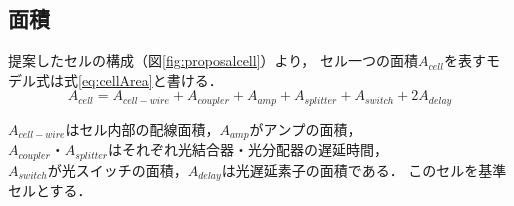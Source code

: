 \subsection{面積}
提案したセルの構成（図\ref{fig:proposalcell}）より，
セル一つの面積$A_{cell}$を表すモデル式は式\ref{eq:cellArea}と書ける．
\begin{equation}
A_{cell} = A_{cell-wire}+A_{coupler}+A_{amp}+A_{splitter}+A_{switch}+2A_{delay}
\label{eq:cellArea}
\end{equation}

$A_{cell-wire}はセル内部の配線面積，A_{amp}がアンプの面積，$
$A_{coupler}・A_{splitter}はそれぞれ光結合器・光分配器の遅延時間，$
$A_{switch}が光スイッチの面積，A_{delay}は光遅延素子の面積である．$
このセルを基準セルとする．

